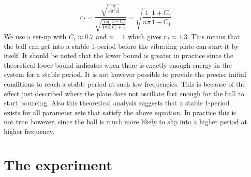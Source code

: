 \documentclass[12pt,oneside,a4paper]{article}
\numberwithin{equation}{section}
\begin{document}
{{{{\begin{equation}
	r_f=\frac{\sqrt{\frac{g}{4\pi^2A}}}{\sqrt{\frac{ng}{4\pi A}\frac{1-C_r}{C_r+1}}} = \sqrt{\frac{1}{n\pi} \frac{1+C_r}{1-C_1}}
\end{equation}
We use a set-up with $C_r\approx 0.7$ and $n=1$ which gives $r_f\approx1.3$. This means that the ball can get into a stable 1-period before the vibrating plate can start it by itself. It should be noted that the lower bound is greater in practice since the theoretical lower bound indicates when there is exactly enough energy in the system for a stable period. It is not however possible to provide the precise initial conditions to reach a stable period at such low frequencies. This is because of the effect just described where the plate does not oscillate fast enough for the ball to start bouncing. Also this theoretical analysis suggests that a stable 1-period exists for all parameter sets that satisfy the above equation. In practice this is not true however, since the ball is much more likely to slip into a higher period at higher frequency. 

\section{The experiment}
\label{expsetup}
}}}}
\end{document}
